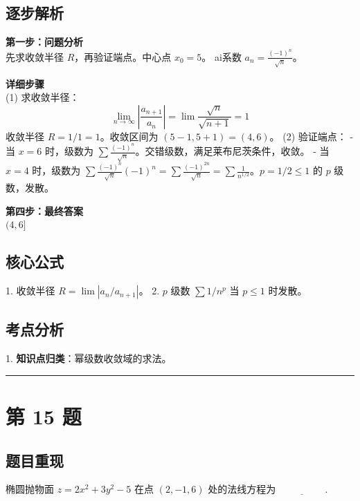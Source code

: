 \documentclass[10pt, a4paper]{ctexart}
\newcommand{\problemheader}{
    \vspace{0.5cm}
    \noindent\rule[0.5ex]{\linewidth}{2pt} %
}
\newcommand{\analysisheader}{
    \vspace{0.2cm}
    \noindent{\color{red}\rule[0.5ex]{\linewidth}{0.5pt}} %
    \vspace{0.1cm}
}
\begin{document}
\analysisheader
{\color{red}
\subsection*{逐步解析}
\textbf{第一步：问题分析} \\
先求收敛半径 $R$，再验证端点。中心点 $x_0 = 5$。 ai系数 $a_n = \frac{(-1)^n}{\sqrt{n}}$。

\textbf{详细步骤} \\
(1) 求收敛半径：
\[ \lim_{n\to\infty} \left| \frac{a_{n+1}}{a_n} \right| = \lim \frac{\sqrt{n}}{\sqrt{n+1}} = 1 \]
收敛半径 $R = 1/1 = 1$。收敛区间为 $(5-1, 5+1) = (4, 6)$。
(2) 验证端点：
- 当 $x=6$ 时，级数为 $\sum \frac{(-1)^n}{\sqrt{n}}$。交错级数，满足莱布尼茨条件，收敛。
- 当 $x=4$ 时，级数为 $\sum \frac{(-1)^n}{\sqrt{n}}(-1)^n = \sum \frac{(-1)^{2n}}{\sqrt{n}} = \sum \frac{1}{n^{1/2}}$。$p=1/2 \le 1$ 的 $p$ 级数，发散。

\textbf{第四步：最终答案} \\
$(4, 6]$

\subsection*{核心公式}
1. 收敛半径 $R = \lim |a_n/a_{n+1}|$。
2. $p$ 级数 $\sum 1/n^p$ 当 $p \le 1$ 时发散。

\subsection*{考点分析}
1. \textbf{知识点归类}：幂级数收敛域的求法。
}

\problemheader
\section*{第 15 题}
\subsection*{题目重现}
椭圆抛物面 $z = 2x^2 + 3y^2 - 5$ 在点 $(2,-1,6)$ 处的法线方程为 $\underline{\hspace{2cm}}$.
\end{document}
